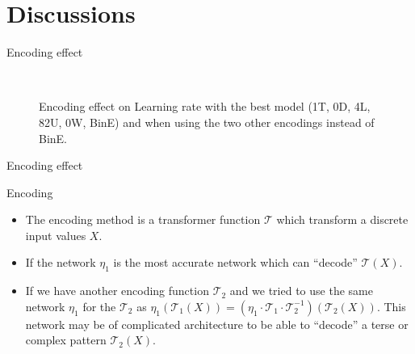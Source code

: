 \section{Discussions}


\begin{frame}[fragile]{Encoding effect}
	\begin{figure}[!t]
		  \begin{tikzpicture}
		
		  \end{tikzpicture}
		\caption{Encoding effect on Learning rate with the best model (1T, 0D, 4L, 82U, 0W, BinE) and when using the two other encodings	instead of BinE.}~\label{Fig:ArabicModelsResults}

	\end{figure}

\end{frame}



\begin{frame}[fragile]{Encoding effect}

\begin{block}{Encoding}
	\begin{itemize}
		
		\item The encoding method is a transformer function $\mathcal{T}$ which transform a discrete input values $X$. 
		\item If the network $\eta_1$ is the most accurate network which can ``decode'' $\mathcal{T}(X)$. 
		\item If we have another encoding function $\mathcal{T}_2$ and we tried to use the same network $\eta_1$ for the $\mathcal{T}_2$ as $\eta_1\left(\mathcal{T}_1(X)\right) = \left(\eta_1\cdot\mathcal{T}_1\cdot \mathcal{T}_2^{-1} \right)\left(\mathcal{T}_2(X)\right)$. This network may be of complicated architecture to be able to “decode” a terse or complex pattern $\mathcal{T}_2(X)$.
		
	\end{itemize}
	
\end{block}

\end{frame}

